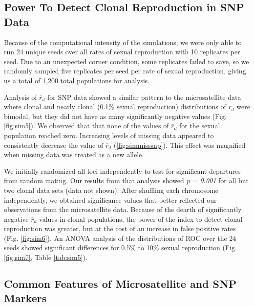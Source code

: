 \documentclass[]{article}
\theoremstyle{definition}
\theoremstyle{definition}
\theoremstyle{remark}
\begin{document}
\subsection{Power To Detect Clonal Reproduction in SNP
Data}\label{power-to-detect-clonal-reproduction-in-snp-data}

Because of the computational intensity of the simulations, we were only
able to run 24 unique seeds over all rates of sexual reproduction with
10 replicates per seed. Due to an unexpected corner condition, some
replicates failed to save, so we randomly sampled five replicates per
seed per rate of sexual reproduction, giving us a total of 1,200 total
populations for analysis.

Analysis of \(\bar{r}_d\) for SNP data showed a similar pattern to the
microsatellite data where clonal and nearly clonal (0.1\% sexual
reproduction) distributions of \(\bar{r}_d\) were bimodal, but they did
not have as many significantly negative values (Fig. \ref{fig:sim5}). We
observed that that none of the values of \(\bar{r}_d\) for the sexual
population reached zero. Increasing levels of missing data appeared to
consistently decrease the value of \(\bar{r}_d\) (\ref{fig:simmisssnp}).
This effect was magnified when missing data was treated as a new allele.

We initially randomized all loci independently to test for significant
departures from random mating. Our results from that analysis showed
\emph{p = 0.001} for all but two clonal data sets (data not shown).
After shuffling each chromosome independently, we obtained significance
values that better reflected our observations from the microsatellite
data. Because of the dearth of significantly negative \(\bar{r}_d\)
values in clonal populations, the power of the index to detect clonal
reproduction was greater, but at the cost of an increase in false
positive rates (Fig. \ref{fig:sim6}). An ANOVA analysis of the
distributions of ROC over the 24 seeds showed significant differences
for 0.5\% to 10\% sexual reproduction (Fig. \ref{fig:sim7}, Table
\ref{tab:sim5}).

\subsection{Common Features of Microsatellite and SNP
Markers}\label{common-features-of-microsatellite-and-snp-markers}
\end{document}
